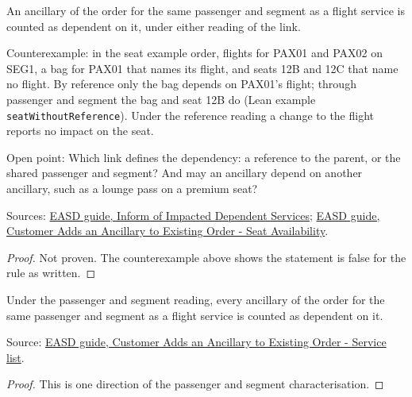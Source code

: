 \begin{theorem}
  \label{thm:ancillaries-dependents-cover}
  An ancillary of the order for the same passenger and segment as a flight
  service is counted as dependent on it, under either reading of the link.

  Counterexample: in the seat example order, flights for PAX01 and PAX02 on
  SEG1, a bag for PAX01 that names its flight, and seats 12B and 12C that
  name no flight.  By reference only the bag depends on PAX01's flight;
  through passenger and segment the bag and seat 12B do (Lean example
  \texttt{seatWithoutReference}).  Under the reference reading a change to
  the flight reports no impact on the seat.

  Open point: Which link defines the dependency: a reference to the parent,
  or the shared passenger and segment?  And may an ancillary depend on
  another ancillary, such as a lounge pass on a premium seat?

  Sources: \href{https://standards.atlassian.net/wiki/spaces/EASD/pages/672825400}{EASD guide, Inform of Impacted Dependent Services};
  \href{https://standards.atlassian.net/wiki/spaces/EASD/pages/842268814}{EASD guide, Customer Adds an Ancillary to Existing Order - Seat Availability}.
\end{theorem}
\begin{proof}
  Not proven.  The counterexample above shows the statement is false for the
  rule as written.
\end{proof}

\begin{theorem}
  \label{thm:ancillaries-dependents-cover-passenger-segment}
  Under the passenger and segment reading, every ancillary of the order for
  the same passenger and segment as a flight service is counted as
  dependent on it.

  Source: \href{https://standards.atlassian.net/wiki/spaces/EASD/pages/842301531}{EASD guide, Customer Adds an Ancillary to Existing Order - Service list}.
\end{theorem}
\begin{proof}
  This is one direction of the passenger and segment characterisation.
\end{proof}

